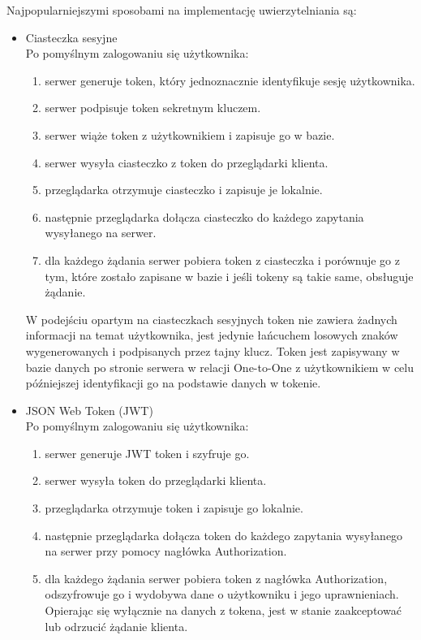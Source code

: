 		Najpopularniejszymi sposobami na implementację uwierzytelniania są:
		\begin{itemize}
			\item{Ciasteczka sesyjne} \\
			Po pomyślnym zalogowaniu się użytkownika:
			\begin{enumerate}
				\item serwer generuje token, który jednoznacznie identyfikuje sesję użytkownika.
				\item serwer podpisuje token sekretnym kluczem.
				\item serwer wiąże token z użytkownikiem i zapisuje go w bazie.
				\item serwer wysyła ciasteczko z token do przeglądarki klienta.
				\item przeglądarka otrzymuje ciasteczko i zapisuje je lokalnie.
				\item następnie przeglądarka dołącza ciasteczko do każdego zapytania wysyłanego na serwer.
				\item dla każdego żądania serwer pobiera token z ciasteczka i porównuje go z tym, które zostało zapisane w bazie i jeśli tokeny są takie same, obsługuje żądanie.
			\end{enumerate}
			
			W podejściu opartym na ciasteczkach sesyjnych token nie zawiera żadnych informacji na temat użytkownika, jest jedynie łańcuchem losowych znaków wygenerowanych i podpisanych przez tajny klucz. Token jest zapisywany w bazie danych po stronie serwera w relacji One-to-One z użytkownikiem w celu późniejszej identyfikacji go na podstawie danych w tokenie.
		
			\item{JSON Web Token (JWT)} \\
			Po pomyślnym zalogowaniu się użytkownika:
			\begin{enumerate}
				\item serwer generuje JWT token i szyfruje go.
				\item serwer wysyła token do przeglądarki klienta.
				\item przeglądarka otrzymuje token i zapisuje go lokalnie.
				\item następnie przeglądarka dołącza token do każdego zapytania wysyłanego na serwer przy pomocy nagłówka Authorization.
				\item dla każdego żądania serwer pobiera token z nagłówka Authorization, odszyfrowuje go i wydobywa dane o użytkowniku i jego uprawnieniach. Opierając się wyłącznie na danych z tokena, jest w stanie zaakceptować lub odrzucić żądanie klienta.
			\end{enumerate}
		

\end{itemize}
